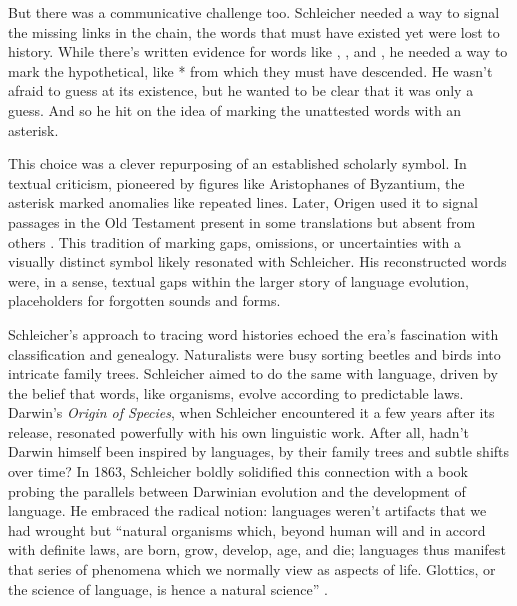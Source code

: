 But there was a communicative challenge too. Schleicher needed a way to signal the missing links in the chain, the words that must have existed yet were lost to history. %
While there's written evidence for words like , , and , he needed a way to mark the hypothetical, like * from which they must have descended. He wasn't afraid to guess at its existence, but he wanted to be clear that it was only a guess. And so he hit on the idea of marking the unattested words with an asterisk.

This choice was a clever repurposing of an established scholarly symbol. %
In textual criticism, pioneered by figures like Aristophanes of Byzantium, the asterisk marked anomalies like repeated lines. Later, Origen used it to signal passages in the Old Testament present in some translations but absent from others \citep{Grafton2010}. This tradition of marking gaps, omissions, or uncertainties with a visually distinct symbol likely resonated with Schleicher. His reconstructed words were, in a sense, textual gaps within the larger story of language evolution, placeholders for forgotten sounds and forms.

Schleicher's approach to tracing word histories echoed the era's fascination with classification and genealogy. Naturalists were busy sorting beetles and birds into intricate family trees. Schleicher aimed to do the same with language, driven by the belief that words, like organisms, evolve according to predictable laws. Darwin's \textit{Origin of Species}, when Schleicher encountered it a few years after its release, resonated powerfully with his own linguistic work. After all, hadn't Darwin himself been inspired by languages, by their family trees and subtle shifts over time? %
In 1863, Schleicher boldly solidified this connection with a book probing the parallels between Darwinian evolution and the development of language. He embraced the radical notion: languages weren't artifacts that we had wrought but \enquote{natural organisms which, beyond human will and in accord with definite laws, are born, grow, develop, age, and die; languages thus manifest that series of phenomena which we normally view as aspects of life. Glottics, or the science of language, is hence a natural science} \citep[7, cited in][82]{schleicher1863,Goldsmith2019}.

